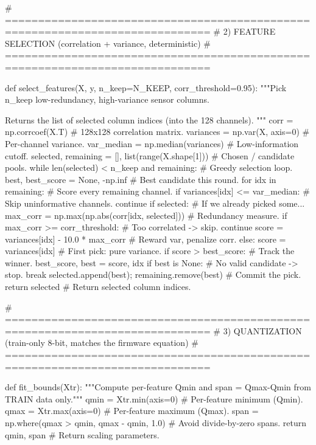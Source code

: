 # =============================================================================
# 2) FEATURE SELECTION  (correlation + variance, deterministic)
# =============================================================================

def select_features(X, y, n_keep=N_KEEP, corr_threshold=0.95):
    """Pick n_keep low-redundancy, high-variance sensor columns.

    Returns the list of selected column indices (into the 128 channels).
    """
    corr = np.corrcoef(X.T)                         # 128x128 correlation matrix.
    variances = np.var(X, axis=0)                   # Per-channel variance.
    var_median = np.median(variances)               # Low-information cutoff.
    selected, remaining = [], list(range(X.shape[1]))  # Chosen / candidate pools.
    while len(selected) < n_keep and remaining:     # Greedy selection loop.
        best, best_score = None, -np.inf            # Best candidate this round.
        for idx in remaining:                       # Score every remaining channel.
            if variances[idx] <= var_median:        # Skip uninformative channels.
                continue
            if selected:                            # If we already picked some...
                max_corr = np.max(np.abs(corr[idx, selected]))  # Redundancy measure.
                if max_corr >= corr_threshold:      # Too correlated -> skip.
                    continue
                score = variances[idx] - 10.0 * max_corr  # Reward var, penalize corr.
            else:
                score = variances[idx]              # First pick: pure variance.
            if score > best_score:                  # Track the winner.
                best_score, best = score, idx
        if best is None:                            # No valid candidate -> stop.
            break
        selected.append(best); remaining.remove(best)  # Commit the pick.
    return selected                                 # Return selected column indices.

# =============================================================================
# 3) QUANTIZATION  (train-only 8-bit, matches the firmware equation)
# =============================================================================

def fit_bounds(Xtr):
    """Compute per-feature Qmin and span = Qmax-Qmin from TRAIN data only."""
    qmin = Xtr.min(axis=0)                          # Per-feature minimum (Qmin).
    qmax = Xtr.max(axis=0)                          # Per-feature maximum (Qmax).
    span = np.where(qmax > qmin, qmax - qmin, 1.0)  # Avoid divide-by-zero spans.
    return qmin, span                               # Return scaling parameters.

